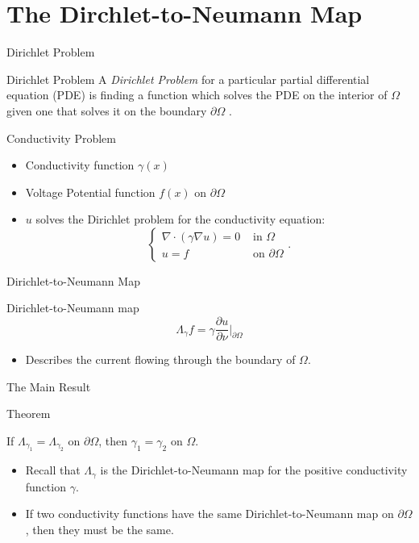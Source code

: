 \documentclass[12pt]{beamer}
\begin{document}
\section{The Dirchlet-to-Neumann Map}
\begin{frame}{Dirichlet Problem}
    \begin{block}{Dirichlet Problem}
        A \textit{Dirichlet Problem} for a particular partial differential equation (PDE) is finding a function which solves the PDE on the interior of $\Omega$ given one that solves it on the boundary $\partial \Omega$ . 
    \end{block}
\end{frame}
\begin{frame}{Conductivity Problem}
    \begin{itemize}
        \item Conductivity function $\gamma(x)$
        \pause
        \item Voltage Potential function $f(x)$ on $\partial\Omega$
        \pause
        \item $u$ solves the Dirichlet problem for the conductivity equation: \[\begin{cases}
            \nabla\cdot(\gamma\nabla u)=0 & \text{ in }\Omega \\ u=f&\text{ on }\partial\Omega
        \end{cases}.\]
    \end{itemize}
\end{frame}
\begin{frame}{Dirichlet-to-Neumann Map}
    \begin{block}{Dirichlet-to-Neumann map}
        \[\Lambda_{\gamma}f=\gamma\frac{\partial u}{\partial \nu}\bigg|_{\partial \Omega}\]
    \end{block}
    \pause \begin{itemize}
        \item Describes the current flowing through the boundary of $\Omega$. 
    \end{itemize}
\end{frame}
\begin{frame}{The Main Result}
    \begin{block}{Theorem}
        \begin{center}
            If $\Lambda_{\gamma_1}=\Lambda_{\gamma_2}$ on $\partial \Omega$, then $\gamma_1=\gamma_2$ on $\Omega$. 
        \end{center}
    \end{block}
    \begin{itemize}
        \item Recall that $\Lambda_{\gamma}$ is the Dirichlet-to-Neumann map for the positive conductivity function $\gamma$. 
        \item If two conductivity functions have the same Dirichlet-to-Neumann map on $\partial\Omega$, then they must be the same. 
    \end{itemize}
\end{frame}
\end{document}
